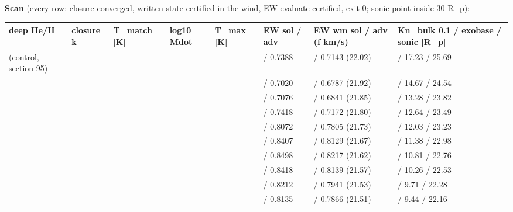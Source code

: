 \documentclass[english,a4paper]{my_memo}
\begin{document}
\textbf{Scan} (every row: closure converged, written state certified in the
wind, EW evaluate certified, exit 0; sonic point inside 30 R\_p):

{\def\LTcaptype{none} %
{\small
\begin{longtable}[]{@{}>{\raggedright\arraybackslash}p{\dimexpr(\linewidth-16\tabcolsep)/8\relax}>{\raggedright\arraybackslash}p{\dimexpr(\linewidth-16\tabcolsep)/8\relax}>{\raggedright\arraybackslash}p{\dimexpr(\linewidth-16\tabcolsep)/8\relax}>{\raggedright\arraybackslash}p{\dimexpr(\linewidth-16\tabcolsep)/8\relax}>{\raggedright\arraybackslash}p{\dimexpr(\linewidth-16\tabcolsep)/8\relax}>{\raggedright\arraybackslash}p{\dimexpr(\linewidth-16\tabcolsep)/8\relax}>{\raggedright\arraybackslash}p{\dimexpr(\linewidth-16\tabcolsep)/8\relax}>{\raggedright\arraybackslash}p{\dimexpr(\linewidth-16\tabcolsep)/8\relax}@{}}
\toprule\noalign{}
deep He/H & closure k & T\_match {[}K{]} & log10 Mdot & T\_max {[}K{]} & EW sol / adv & EW wm sol / adv (f km/s) & Kn\_bulk 0.1 / exobase / sonic {[}R\_p{]} \\
\midrule\noalign{}
\endhead
\bottomrule\noalign{}
\endlastfoot
2.09 (control, section 95) & 1 & 350.71 & 7.8864 & 4961 & 0.7353 / 0.7388 & 0.7109 / 0.7143 (22.02) & 5.70 / 17.23 / 25.69 \\
3.0 & 1 & 332.83 & 7.8255 & 5358 & 0.6993 / 0.7020 & 0.6761 / 0.6787 (21.92) & 5.06 / 14.67 / 24.54 \\
4.0 & 1 & 326.05 & 7.8007 & 5657 & 0.7054 / 0.7076 & 0.6820 / 0.6841 (21.85) & 4.72 / 13.28 / 23.82 \\
5.0 & 1 & 321.73 & 7.8012 & 5877 & 0.7399 / 0.7418 & 0.7154 / 0.7172 (21.80) & 4.57 / 12.64 / 23.49 \\
7.0 & 1 & 328.84 & 7.8135 & 6159 & 0.8058 / 0.8072 & 0.7791 / 0.7805 (21.73) & 4.45 / 12.03 / 23.23 \\
10 & 1 & 334.06 & 7.8136 & 6384 & 0.8398 / 0.8407 & 0.8121 / 0.8129 (21.67) & 4.31 / 11.38 / 22.98 \\
14 & 1 & 335.13 & 7.8067 & 6541 & 0.8493 / 0.8498 & 0.8212 / 0.8217 (21.62) & 4.18 / 10.81 / 22.76 \\
20 & 1 & 343.02 & 7.7936 & 6660 & 0.8416 / 0.8418 & 0.8137 / 0.8139 (21.57) & 4.06 / 10.26 / 22.53 \\
30 & 1 & 357.62 & 7.7749 & 6754 & 0.8212 / 0.8212 & 0.7941 / 0.7941 (21.53) & 3.93 / 9.71 / 22.28 \\
40 & 2 & 371.07 & 7.7661 & 6803 & 0.8137 / 0.8135 & 0.7868 / 0.7866 (21.51) & 3.87 / 9.44 / 22.16 \\

\end{longtable}}}
\end{document}
